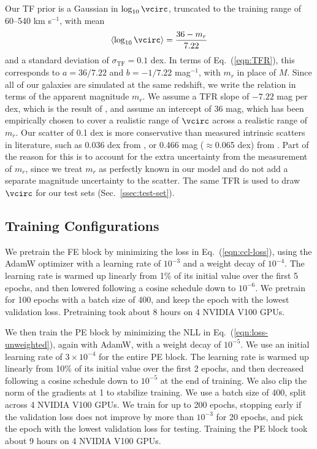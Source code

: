 Our TF prior is a Gaussian in $\log_{10}\vcirc$, truncated to the training range of 60--540 km s$^{-1}$, with mean
\begin{equation}
\label{eqn:tf-mean}
    \langle\log_{10}\vcirc\rangle = \frac{36 - m_r}{7.22}
\end{equation}
and a standard deviation of $\sigma_\mathrm{TF}=0.1$ dex. In terms of Eq.~(\ref{eqn:TFR}), this corresponds to $a = 36/7.22$ and $b = -1/7.22$ mag$^{-1}$, with $m_r$ in place of $M$. Since all of our galaxies are simulated at the same redshift, we write the relation in terms of the apparent magnitude $m_r$. We assume a TFR slope of $-7.22$ mag per dex, which is the result of \citep{DESIPVTF2025}, and assume an intercept of 36 mag, which has been empirically chosen to cover a realistic range of $\vcirc$ across a realistic range of $m_r$. Our scatter of 0.1 dex is more conservative than measured intrinsic scatters in literature, such as 0.036 dex from \citep{Reyes11}, or 0.466 mag ($\approx$0.065 dex) from \citep{DESIPVTF2025}. Part of the reason for this is to account for the extra uncertainty from the measurement of $m_r$, since we treat $m_r$ as perfectly known in our model and do not add a separate magnitude uncertainty to the scatter. The same TFR is used to draw $\vcirc$ for our test sets (Sec.~\ref{ssec:test-set}).

\subsection{Training Configurations}
\label{ssec:train-conf}
We pretrain the FE block by minimizing the loss in Eq.~(\ref{eqn:ccl-loss}), using the AdamW optimizer \citep{AdamW} with a learning rate of $10^{-3}$ and a weight decay of $10^{-4}$. The learning rate is warmed up linearly from 1\% of its initial value over the first 5 epochs, and then lowered following a cosine schedule down to $10^{-6}$. We pretrain for 100 epochs with a batch size of 400, and keep the epoch with the lowest validation loss. Pretraining took about 8 hours on 4 NVIDIA V100 GPUs.

We then train the PE block by minimizing the NLL in Eq.~(\ref{eqn:loss-unweighted}), again with AdamW, with a weight decay of $10^{-5}$. We use an initial learning rate of $3\times10^{-4}$ for the entire PE block. The learning rate is warmed up linearly from 10\% of its initial value over the first 2 epochs, and then decreased following a cosine schedule down to $10^{-5}$ at the end of training. We also clip the norm of the gradients at 1 to stabilize training. We use a batch size of 400, split across 4 NVIDIA V100 GPUs. We train for up to 200 epochs, stopping early if the validation loss does not improve by more than $10^{-3}$ for 20 epochs, and pick the epoch with the lowest validation loss for testing. Training the PE block took about 9 hours on 4 NVIDIA V100 GPUs.
